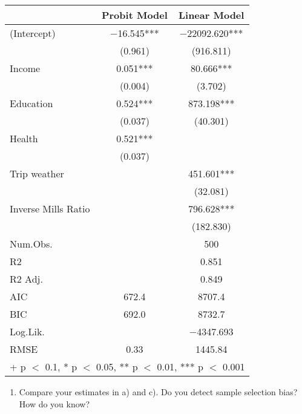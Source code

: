 \documentclass[
]{article}
\newenvironment{Shaded}{\begin{snugshade}}{\end{snugshade}}
\newcommand{\CommentTok}[1]{\textcolor[rgb]{0.56,0.35,0.01}{\textit{#1}}}
\providecommand{\tightlist}{%
  \setlength{\itemsep}{0pt}\setlength{\parskip}{0pt}}
\begin{document}
\begin{table}
\centering
\begin{tabular}[t]{lcc}
\toprule
  & Probit Model & Linear Model\\
\midrule
(Intercept) & \num{-16.545}*** & \num{-22092.620}***\\
 & (\num{0.961}) & (\num{916.811})\\
Income & \num{0.051}*** & \num{80.666}***\\
 & (\num{0.004}) & (\num{3.702})\\
Education & \num{0.524}*** & \num{873.198}***\\
 & (\num{0.037}) & (\num{40.301})\\
Health & \num{0.521}*** & \\
 & (\num{0.037}) & \\
Trip weather &  & \num{451.601}***\\
 &  & (\num{32.081})\\
Inverse Mills Ratio &  & \num{796.628}***\\
 &  & (\num{182.830})\\
\midrule
Num.Obs. &  & \num{500}\\
R2 &  & \num{0.851}\\
R2 Adj. &  & \num{0.849}\\
AIC & \num{672.4} & \num{8707.4}\\
BIC & \num{692.0} & \num{8732.7}\\
Log.Lik. &  & \num{-4347.693}\\
RMSE & \num{0.33} & \num{1445.84}\\
\bottomrule
\multicolumn{3}{l}{\rule{0pt}{1em}+ p $<$ 0.1, * p $<$ 0.05, ** p $<$ 0.01, *** p $<$ 0.001}\\
\end{tabular}
\end{table}

\begin{Shaded}
\end{Shaded}

\begin{enumerate}
\def\labelenumi{\alph{enumi})}
\setcounter{enumi}{3}
\tightlist
\item
  Compare your estimates in a) and c). Do you detect sample selection
  bias? How do you know?
\end{enumerate}
\end{document}
